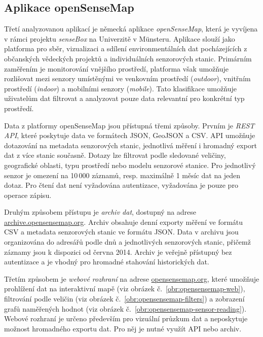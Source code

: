\FloatBarrier
\subsection{Aplikace openSenseMap}

Třetí analyzovanou aplikací je německá aplikace \textit{openSenseMap}, která je vyvíjena v rámci projektu \textit{senseBox} na Univerzitě v Münsteru. Aplikace slouží jako platforma pro sběr, vizualizaci a sdílení environmentálních dat pocházejících z občanských vědeckých projektů a individuálních senzorových stanic. \parencite{SenseboxOpenSenseMap2026} Primárním zaměřením je monitorování vnějšího prostředí, platforma však umožňuje rozlišovat mezi senzory umístěnými ve venkovním prostředí (\textit{outdoor}), vnitřním prostředí (\textit{indoor}) a mobilními senzory (\textit{mobile}). Tato klasifikace umožňuje uživatelům dat filtrovat a analyzovat pouze data relevantní pro konkrétní typ prostředí. \parencite{OpenSenseMapAPIDocumentation}

Data z platformy openSenseMap jsou přístupná třemi způsoby. Prvním je \textit{REST API}, které poskytuje data ve formátech JSON, GeoJSON a CSV. API umožňuje dotazování na metadata senzorových stanic, jednotlivá měření i hromadný export dat z více stanic současně. Dotazy lze filtrovat podle sledované veličiny, geografické oblasti, typu prostředí nebo modelu senzorové stanice. Pro jednotlivý senzor je omezení na 10\,000 záznamů, resp. maximálně 1 měsíc dat na jeden dotaz. Pro čtení dat není vyžadována autentizace, vyžadována je pouze pro operace zápisu. \parencite{OpenSenseMapAPIDocumentation}

Druhým způsobem přístupu je \textit{archiv dat}, dostupný na adrese \href{https://archive.opensensemap.org/}{archive.opensensemap.org}. Archiv obsahuje denní exporty měření ve formátu CSV a metadata senzorových stanic ve formátu JSON. Data v archivu jsou organizována do adresářů podle dnů a jednotlivých senzorových stanic, přičemž záznamy jsou k dispozici od června 2014. Archiv je veřejně přístupný bez autentizace a je vhodný pro hromadné stahování historických dat. \parencite{zotero-item-562}

Třetím způsobem je \textit{webové rozhraní} na adrese \href{https://opensensemap.org/}{opensensemap.org}, které umožňuje prohlížení dat na interaktivní mapě (viz obrázek č.~\ref{obr:opensensemap-web}), filtrování podle veličin (viz obrázek č.~\ref{obr:opensensemap-filters}) a zobrazení grafů naměřených hodnot (viz obrázek č.~\ref{obr:opensensemap-sensor-reading}). Webové rozhraní je určeno především pro vizuální průzkum dat a neposkytuje možnost hromadného exportu dat. Pro něj je nutné využít API nebo archiv. \parencite{SenseboxOpenSenseMap2026}

